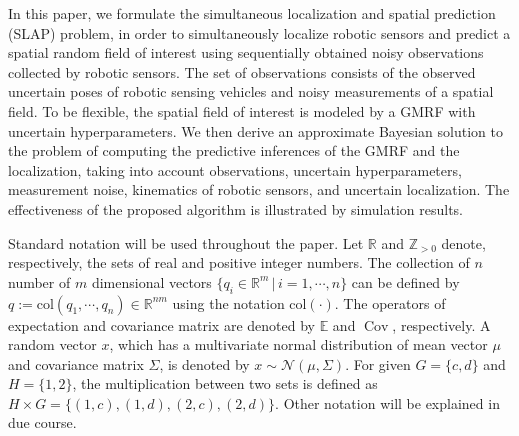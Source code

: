 \documentclass[letterpaper, 10 pt, conference]{ieeeconf}
\newcommand{\set}[1]{\{#1\}} \newcommand{\norm}[1]{\|#1\|}
\newcommand{\mc}[1]{\mathcal{#1}} \newcommand{\mb}[1]{\mathbf{#1}}
\newcommand{\Cov}{\operatorname{Cov}}
\newcommand{\E}{\mathbb{E}}
\newcommand{\Real}{\mathbb{R}}
\newcommand{\Integer}{\mathbb{Z}}
\newcommand{\f}[2]{f_{#1}\left(#2\right)}
\begin{document}
 
 In this paper, we   formulate the simultaneous localization and spatial prediction (SLAP) problem, in order to simultaneously localize robotic sensors and predict a spatial random field of interest using sequentially obtained noisy observations collected by robotic sensors. The set of observations consists of the observed uncertain poses of robotic sensing vehicles and noisy measurements of a spatial field.  To be flexible, the spatial field of interest is modeled by a GMRF with uncertain hyperparameters. We then derive an approximate Bayesian solution to the problem of computing the predictive inferences of the GMRF and the localization, taking into account observations, uncertain hyperparameters, measurement noise, kinematics of robotic sensors, and uncertain localization. The effectiveness of the proposed algorithm is illustrated by simulation results.

 

Standard notation will be used throughout the paper. Let $\Real$ and $\Integer_{>0}$ denote, respectively, the sets of real and positive integer numbers. The collection of $n$ number of $m$ dimensional vectors $\{ q_i \in \Real^m \, |\, i =1, \cdots, n \}$ can be defined by $q:=\text{col} \left (q_1, \cdots, q_n \right ) \in \Real^{nm}$ using the notation $\text{col} (\cdot)$.
The operators of expectation and covariance matrix are denoted by $\E$ and $\Cov$, respectively. A random vector $x$, which has a multivariate normal distribution of mean vector $\mu$ and covariance matrix $\Sigma$, is denoted by $x \sim \mc{N}(\mu,\Sigma)$. For given ${G}=\set{c,d}$ and ${H}=\set{1,2}$, the multiplication between two sets is defined as ${H} \times {G}= \set{(1,c), (1,d),(2, c),(2,d)}$. 
Other notation will be explained in due course.

\end{document}
